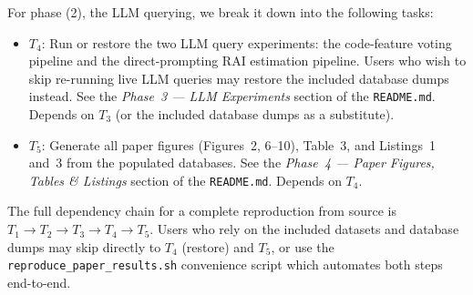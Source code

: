 For phase (2), the LLM querying, we break it down into the following tasks:

\begin{itemize}
    \item $T_4$: Run or restore the two LLM query experiments: the code-feature voting pipeline and the direct-prompting RAI estimation pipeline.
    Users who wish to skip re-running live LLM queries may restore the included database dumps instead.
    See the \textit{Phase~3 --- LLM Experiments} section of the \texttt{README.md}.
    Depends on $T_3$ (or the included database dumps as a substitute).

    \item $T_5$: Generate all paper figures (Figures~2, 6--10), Table~3, and Listings~1 and~3 from the populated databases.
    See the \textit{Phase~4 --- Paper Figures, Tables \& Listings} section of the \texttt{README.md}.
    Depends on $T_4$.
\end{itemize}

The full dependency chain for a complete reproduction from source is $T_1 \rightarrow T_2 \rightarrow T_3 \rightarrow T_4 \rightarrow T_5$.
Users who rely on the included datasets and database dumps may skip directly to $T_4$ (restore) and $T_5$, or use the \texttt{reproduce\_paper\_results.sh} convenience script which automates both steps end-to-end.


% 
% 







